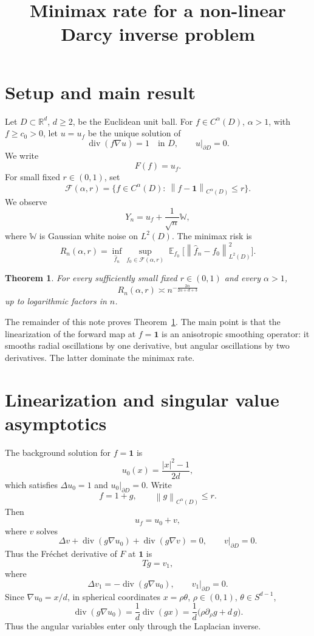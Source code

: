 \documentclass[11pt]{article}
\title{Minimax rate for a non-linear Darcy inverse problem}
\author{}
\date{}
\newtheorem{theorem}{Theorem}[section]
\theoremstyle{remark}
\DeclareMathOperator{\div}{div}
\DeclareMathOperator{\E}{\mathbb{E}}
\newcommand{\R}{\mathbb{R}}
\newcommand{\norm}[1]{\left\|#1\right\|}
\newcommand{\one}{\mathbf{1}}
\begin{document}
\maketitle

\section{Setup and main result}

Let $D\subset \R^d$, $d\ge 2$, be the Euclidean unit ball. For $f\in C^\alpha(D)$,
$\alpha>1$, with $f\ge c_0>0$, let $u=u_f$ be the unique solution of
\[
\div(f\nabla u)=1\quad \text{in }D,\qquad u|_{\partial D}=0.
\]
We write
\[
F(f)=u_f.
\]
For small fixed $r\in(0,1)$, set
\[
\mathcal F(\alpha,r)=\{f\in C^\alpha(D):\ \norm{f-\one}_{C^\alpha(D)}\le r\}.
\]
We observe
\[
Y_n=u_f+\frac1{\sqrt n}\mathbb W,
\]
where $\mathbb W$ is Gaussian white noise on $L^2(D)$.  The minimax risk is
\[
R_n(\alpha,r)=\inf_{\hat f_n}\sup_{f_0\in\mathcal F(\alpha,r)}
\E_{f_0}\bigl[\norm{\hat f_n-f_0}_{L^2(D)}^2\bigr].
\]

\begin{theorem}\label{thm:main}
For every sufficiently small fixed $r\in(0,1)$ and every $\alpha>1$,
\[
R_n(\alpha,r)\asymp n^{-\frac{2\alpha}{2\alpha+d+3}}
\]
up to logarithmic factors in $n$.
\end{theorem}

The remainder of this note proves Theorem~\ref{thm:main}. The main point is that the
linearization of the forward map at $f=\one$ is an anisotropic smoothing operator:
it smooths radial oscillations by one derivative, but angular oscillations by two
derivatives. The latter dominate the minimax rate.

\section{Linearization and singular value asymptotics}

The background solution for $f=\one$ is
\[
u_0(x)=\frac{|x|^2-1}{2d},
\]
which satisfies $\Delta u_0=1$ and $u_0|_{\partial D}=0$. Write
\[
f=1+g,\qquad \norm{g}_{C^\alpha(D)}\le r.
\]
Then
\[
u_f=u_0+v,
\]
where $v$ solves
\[
\Delta v+\div(g\nabla u_0)+\div(g\nabla v)=0,\qquad v|_{\partial D}=0.
\]
Thus the Fr\'echet derivative of $F$ at $\one$ is
\[
Tg=v_1,
\]
where
\begin{equation}\label{eq:T}
\Delta v_1=-\div(g\nabla u_0),\qquad v_1|_{\partial D}=0.
\end{equation}
Since $\nabla u_0=x/d$, in spherical coordinates $x=\rho\theta$, $\rho\in(0,1)$,
$\theta\in S^{d-1}$,
\[
\div(g\nabla u_0)=\frac1d\div(gx)
=\frac1d\bigl(\rho\partial_\rho g+d\,g\bigr).
\]
Thus the angular variables enter only through the Laplacian inverse.
\end{document}
